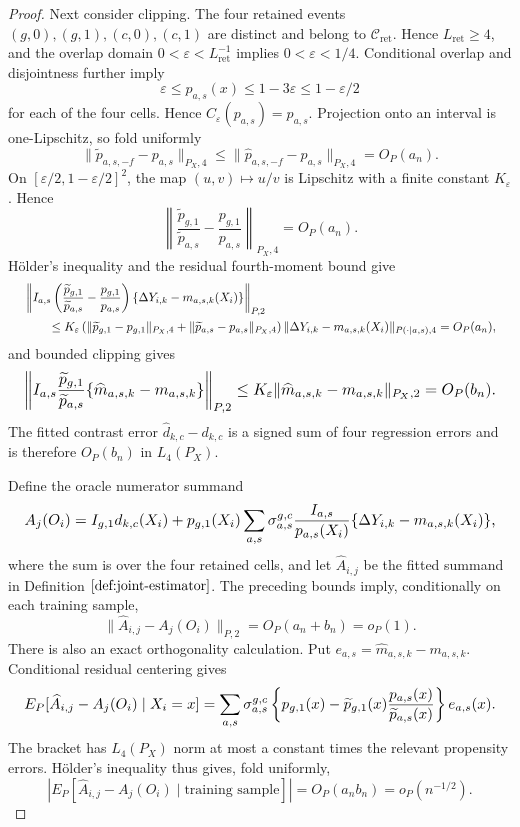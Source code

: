 \documentclass{article}
\begin{document}
\begin{proof}
Next consider clipping. The four retained events \((g,0),(g,1),(c,0),(c,1)\) are distinct and belong to \(\mathcal C_{\mathrm{ret}}\). Hence \(L_{\mathrm{ret}}\ge4\), and the overlap domain \(0<\varepsilon<L_{\mathrm{ret}}^{-1}\) implies \(0<\varepsilon<1/4\). Conditional overlap and disjointness further imply
\[
 \varepsilon\le p_{a,s}(x)\le1-3\varepsilon
 \le1-\varepsilon/2
\]
for each of the four cells. Hence \(C_\varepsilon(p_{a,s})=p_{a,s}\). Projection onto an interval is one-Lipschitz, so fold uniformly
\[
 \|\widetilde p_{a,s,-f}-p_{a,s}\|_{P_X,4}
 \le\|\widehat p_{a,s,-f}-p_{a,s}\|_{P_X,4}=O_P(a_n).
\]
On \([\varepsilon/2,1-\varepsilon/2]^2\), the map \((u,v)\mapsto u/v\) is Lipschitz with a finite constant \(K_\varepsilon\). Hence
\[
 \left\|\frac{\widetilde p_{g,1}}{\widetilde p_{a,s}}
       -\frac{p_{g,1}}{p_{a,s}}\right\|_{P_X,4}=O_P(a_n).
\]
Hölder's inequality and the residual fourth-moment bound give
\[
\makebox[\linewidth][c]{\resizebox{0.98\linewidth}{!}{\(\displaystyle \begin{aligned}
 &\left\|I_{a,s}\left(
 \frac{\widetilde p_{g,1}}{\widetilde p_{a,s}}
 -\frac{p_{g,1}}{p_{a,s}}\right)
 \{\Delta Y_{i,k}-m_{a,s,k}(X_i)\}\right\|_{P,2}\\
 &\qquad\le K_\varepsilon\left(
 \|\widetilde p_{g,1}-p_{g,1}\|_{P_X,4}
 +\|\widetilde p_{a,s}-p_{a,s}\|_{P_X,4}\right)
 \|\Delta Y_{i,k}-m_{a,s,k}(X_i)\|_{P(\cdot\mid a,s),4}
 =O_P(a_n),
\end{aligned}\)}}
\]
and bounded clipping gives
\[
\makebox[\linewidth][c]{\resizebox{0.98\linewidth}{!}{\(\displaystyle \left\|I_{a,s}\frac{\widetilde p_{g,1}}{\widetilde p_{a,s}}
 \{\widehat m_{a,s,k}-m_{a,s,k}\}\right\|_{P,2}
 \le K_\varepsilon\|\widehat m_{a,s,k}-m_{a,s,k}\|_{P_X,2}
 =O_P(b_n).\)}}
\]
The fitted contrast error \(\widehat d_{k,c}-d_{k,c}\) is a signed sum of four regression errors and is therefore \(O_P(b_n)\) in \(L_4(P_X)\).

Define the oracle numerator summand
\[
\makebox[\linewidth][c]{\resizebox{0.98\linewidth}{!}{\(\displaystyle A_j(O_i)=I_{g,1}d_{k,c}(X_i)
 +p_{g,1}(X_i)\sum_{a,s}\sigma_{a,s}^{g,c}
 \frac{I_{a,s}}{p_{a,s}(X_i)}
 \{\Delta Y_{i,k}-m_{a,s,k}(X_i)\},\)}}
\]
where the sum is over the four retained cells, and let \(\widehat A_{i,j}\) be the fitted summand in Definition \(\ref{def:joint-estimator}\). The preceding bounds imply, conditionally on each training sample,
\[
 \|\widehat A_{i,j}-A_j(O_i)\|_{P,2}=O_P(a_n+b_n)=o_P(1).
\]
There is also an exact orthogonality calculation. Put \(e_{a,s}=\widehat m_{a,s,k}-m_{a,s,k}\). Conditional residual centering gives
\[
\makebox[\linewidth][c]{\resizebox{0.98\linewidth}{!}{\(\displaystyle E_P[\widehat A_{i,j}-A_j(O_i)\mid X_i=x]
 =\sum_{a,s}\sigma_{a,s}^{g,c}
 \left\{p_{g,1}(x)-\widetilde p_{g,1}(x)
 \frac{p_{a,s}(x)}{\widetilde p_{a,s}(x)}\right\}e_{a,s}(x).\)}}
\]
The bracket has \(L_4(P_X)\) norm at most a constant times the relevant propensity errors. Hölder's inequality thus gives, fold uniformly,
\[
 \left|E_P[\widehat A_{i,j}-A_j(O_i)\mid\text{training sample}]\right|
 =O_P(a_nb_n)=o_P(n^{-1/2}).
\]


\end{proof}
\end{document}
